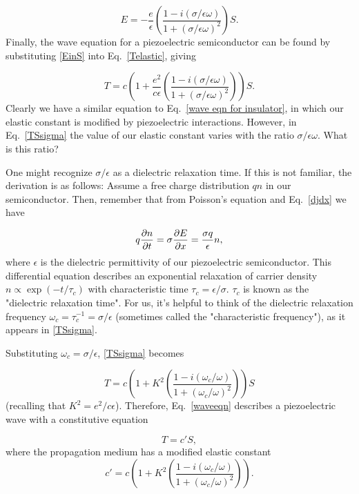 \documentclass[double,12pt,1in,seploa]{beavtex}
\begin{document}
\begin{equation}
    E = -\frac{e}{\epsilon}\left(\frac{1-i(\sigma/\epsilon\omega)}{1+(\sigma/\epsilon\omega)^2}\right)S. \label{EinS}
\end{equation}
Finally, the wave equation for a piezoelectric semiconductor can be found by substituting \ref{EinS} into Eq.\ \ref{Telastic}, giving

\begin{equation}
    T = c\left(1 + \frac{e^2}{c\epsilon}\left(\frac{1-i(\sigma/\epsilon\omega)}{1+(\sigma/\epsilon\omega)^2}\right)\right)S. \label{TSsigma}
\end{equation}
Clearly we have a similar equation to Eq.\ \ref{wave eqn for insulator}, in which our elastic constant is modified by piezoelectric interactions. However, in Eq.\ \ref{TSsigma} the value of our elastic constant varies with the ratio $\sigma/\epsilon\omega$. What is this ratio?

One might recognize $\sigma/\epsilon$ as a dielectric relaxation time. If this is not familiar, the derivation is as follows: Assume a free charge distribution $qn$ in our semiconductor. Then, remember that from Poisson's equation and Eq.\ \ref{djdx} we have

\begin{equation}
    q\pdv{n}{t} = \sigma\pdv{E}{x} = \frac{\sigma q}{\epsilon}n, 
\end{equation}
where $\epsilon$ is the dielectric permittivity of our piezoelectric semiconductor. This differential equation describes an exponential relaxation of carrier density $n \propto \exp(-t/\tau_c)$ with characteristic time $\tau_c = \epsilon/\sigma$. $\tau_c$ is known as the "dielectric relaxation time". For us, it's helpful to think of the dielectric relaxation frequency $\omega_c = \tau_c^{-1} = \sigma/\epsilon$ (sometimes called the "characteristic frequency"), as it appears in \ref{TSsigma}. 

Substituting $\omega_c = \sigma/\epsilon$, \ref{TSsigma} becomes

\begin{equation}
    T = c\left(1 + K^2\left(\frac{1-i(\omega_c/\omega)}{1+(\omega_c/\omega)^2}\right)\right)S \label{waveeqn}
\end{equation}
(recalling that $K^2 = e^2/c\epsilon$). Therefore, Eq.\ \ref{waveeqn} describes a piezoelectric wave with a constitutive equation

\begin{equation}
    T = c' S,
    \label{waveeqn modified}
\end{equation}
where the propagation medium has a modified elastic constant
\begin{equation}
    c' = c\left(1 + K^2\left(\frac{1-i(\omega_c/\omega)}{1+(\omega_c/\omega)^2}\right)\right). \label{cprime}
\end{equation}
\end{document}
